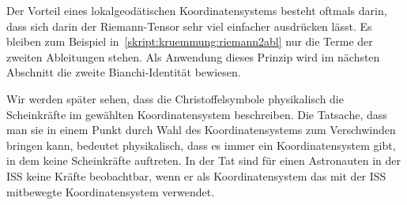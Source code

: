 Der Vorteil eines lokalgeodätischen Koordinatensystems besteht
oftmals darin, dass sich darin der Riemann-Tensor sehr viel
einfacher ausdrücken lässt.
Es bleiben zum Beispiel in~\eqref{skript:kruemmung:riemann2abl}
nur die Terme der zweiten Ableitungen stehen.
Als Anwendung dieses Prinzip wird im nächsten Abschnitt die zweite
Bianchi-Identität bewiesen.

Wir werden später sehen, dass die Christoffelsymbole physikalisch die
Scheinkräfte im gewählten Koordinatensystem beschreiben.
Die Tatsache, dass man sie in einem Punkt durch Wahl des Koordinatensystems
zum Verschwinden bringen kann, bedeutet physikalisch, dass es immer
ein Koordinatensystem gibt, in dem keine Scheinkräfte auftreten.
In der Tat sind für einen Astronauten in der ISS keine Kräfte beobachtbar,
wenn er als Koordinatensystem das mit der ISS mitbewegte Koordinatensystem
verwendet.

